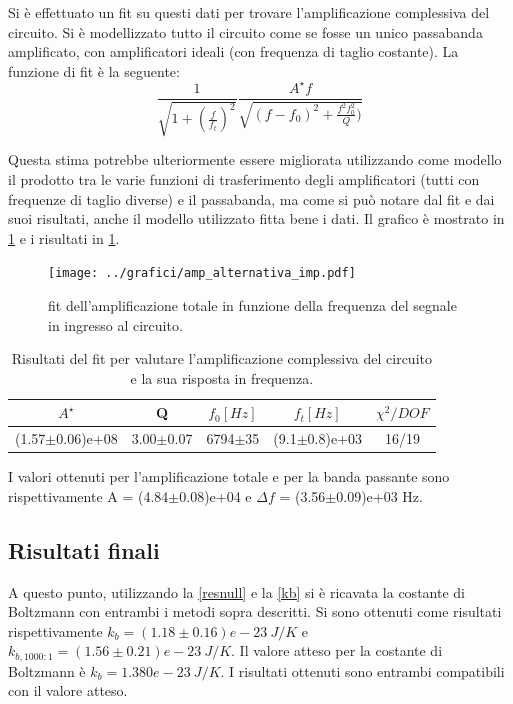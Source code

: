 \documentclass[a4paper,10pt]{article}
\begin{document}
Si è effettuato un fit su questi dati per trovare l'amplificazione complessiva del circuito. Si è modellizzato tutto il circuito come se fosse un unico passabanda amplificato, con amplificatori ideali (con frequenza di taglio costante). La funzione di fit è la seguente:
\begin{equation}
\frac{1}{\sqrt{1+(\frac{f}{f_t})^2}} \frac{A^\star f}{\sqrt{(f - f_0)^2+ \frac{f^2 f_0^2}{Q} )}}
\end{equation}

Questa stima potrebbe ulteriormente essere migliorata utilizzando come modello il prodotto tra le varie funzioni di trasferimento degli amplificatori (tutti con frequenze di taglio diverse) e il passabanda, ma come si può notare dal fit e dai suoi risultati, anche il modello utilizzato fitta bene i dati. Il grafico è mostrato in \cref{fig:ampltot} e i risultati in \cref{tab:risult}.

\begin{figure}[H]
	\centering
	\texttt{[image: ../grafici/amp\_alternativa\_imp.pdf]}
	\caption{fit dell'amplificazione totale in funzione della frequenza del segnale in ingresso al circuito.}
	\label{fig:ampltot}
\end{figure}

\begin{table}[H]
	\centering
	\begin{tabular}{c|c|c|c|c}
	$A^\star$ & Q & $f_0[Hz]$ & $f_t[Hz]$ & $\chi^2/DOF$ \\
	\hline
	(1.57$\pm$0.06)e+08 & 3.00$\pm$0.07 & 6794$\pm$35 & (9.1$\pm$0.8)e+03 & 16/19 \\
	\end{tabular}
	\caption{Risultati del fit per valutare l'amplificazione complessiva del circuito e la sua risposta in frequenza.}
	\label{tab:risult}
\end{table}

I valori ottenuti per l'amplificazione totale e per la banda passante sono rispettivamente A = (4.84$\pm$0.08)e+04 e $\Delta f$ = (3.56$\pm$0.09)e+03 Hz.



\subsection{Risultati finali}
A questo punto, utilizzando la \eqref{resnull} e la \eqref{kb} si è ricavata la costante di Boltzmann con entrambi i metodi sopra descritti. Si sono ottenuti come risultati rispettivamente $k_b = (1.18\pm0.16)e-23~J/K$ e $k_{b,1000:1} = (1.56\pm0.21)e-23~J/K $. Il valore atteso per la costante di Boltzmann è $k_b = 1.380e-23~J/K$. I risultati ottenuti sono entrambi compatibili con il valore atteso. 
\end{document}
